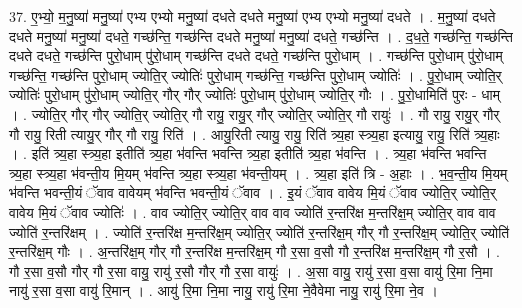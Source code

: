 \documentclass[17pt]{extarticle}
\begin{document}
37. ए॒भ्यो॒ म॒नु॒ष्या॑ मनु॒ष्या॑ एभ्य एभ्यो मनु॒ष्या॑ दधते दधते मनु॒ष्या॑ एभ्य एभ्यो मनु॒ष्या॑ दधते । . म॒नु॒ष्या॑ दधते दधते मनु॒ष्या॑ मनु॒ष्या॑ दधते॒ गच्छ॑न्ति॒ गच्छ॑न्ति दधते मनु॒ष्या॑ मनु॒ष्या॑ दधते॒ गच्छ॑न्ति । . द॒ध॒ते॒ गच्छ॑न्ति॒ गच्छ॑न्ति दधते दधते॒ गच्छ॑न्ति पुरो॒धाम् पु॑रो॒धाम् गच्छ॑न्ति दधते दधते॒ गच्छ॑न्ति पुरो॒धाम् । . गच्छ॑न्ति पुरो॒धाम् पु॑रो॒धाम् गच्छ॑न्ति॒ गच्छ॑न्ति पुरो॒धाम् ज्योति॒र् ज्योतिः॑ पुरो॒धाम् गच्छ॑न्ति॒ गच्छ॑न्ति पुरो॒धाम् ज्योतिः॑ । . पु॒रो॒धाम् ज्योति॒र् ज्योतिः॑ पुरो॒धाम् पु॑रो॒धाम् ज्योति॒र् गौर् गौर् ज्योतिः॑ पुरो॒धाम् पु॑रो॒धाम् ज्योति॒र् गौः । . पु॒रो॒धामिति॑ पुरः - धाम् । . ज्योति॒र् गौर् गौर् ज्योति॒र् ज्योति॒र् गौ रायु॒ रायु॒र् गौर् ज्योति॒र् ज्योति॒र् गौ रायुः॑ । . गौ रायु॒ रायु॒र् गौर् गौ रायु॒ रिती त्यायु॒र् गौर् गौ रायु॒ रिति॑ । . आयु॒रिती त्यायु॒ रायु॒ रिति॑ त्र्य॒हा स्त्र्य॒हा इत्यायु॒ रायु॒ रिति॑ त्र्य॒हाः । . इति॑ त्र्य॒हा स्त्र्य॒हा इतीति॑ त्र्य॒हा भ॑वन्ति भवन्ति त्र्य॒हा इतीति॑ त्र्य॒हा भ॑वन्ति । . त्र्य॒हा भ॑वन्ति भवन्ति त्र्य॒हा स्त्र्य॒हा भ॑वन्ती॒य मि॒यम् भ॑वन्ति त्र्य॒हा स्त्र्य॒हा भ॑वन्ती॒यम् । . त्र्य॒हा इति॑ त्रि - अ॒हाः । . भ॒व॒न्ती॒य मि॒यम् भ॑वन्ति भवन्ती॒यं ॅवाव वावेयम् भ॑वन्ति भवन्ती॒यं ॅवाव । . इ॒यं ॅवाव वावेय मि॒यं ॅवाव ज्योति॒र् ज्योति॒र् वावेय मि॒यं ॅवाव ज्योतिः॑ । . वाव ज्योति॒र् ज्योति॒र् वाव वाव ज्योति॑ र॒न्तरि॑क्ष म॒न्तरि॑क्ष॒म् ज्योति॒र् वाव वाव ज्योति॑ र॒न्तरि॑क्षम् । . ज्योति॑ र॒न्तरि॑क्ष म॒न्तरि॑क्ष॒म् ज्योति॒र् ज्योति॑ र॒न्तरि॑क्ष॒म् गौर् गौ र॒न्तरि॑क्ष॒म् ज्योति॒र् ज्योति॑ र॒न्तरि॑क्ष॒म् गौः । . अ॒न्तरि॑क्ष॒म् गौर् गौ र॒न्तरि॑क्ष म॒न्तरि॑क्ष॒म् गौ र॒सा व॒सौ गौ र॒न्तरि॑क्ष म॒न्तरि॑क्ष॒म् गौ र॒सौ । . गौ र॒सा व॒सौ गौर् गौ र॒सा वायु॒ रायु॑ र॒सौ गौर् गौ र॒सा वायुः॑ । . अ॒सा वायु॒ रायु॑ र॒सा व॒सा वायु॑ रि॒मा नि॒मा नायु॑ र॒सा व॒सा वायु॑ रि॒मान् । . आयु॑ रि॒मा नि॒मा नायु॒ रायु॑ रि॒मा ने॒वैवेमा नायु॒ रायु॑ रि॒मा ने॒व । \newline
\pagebreak
{}
\end{document}
